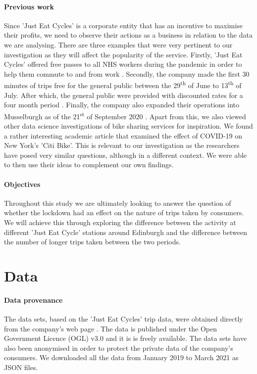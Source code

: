 \documentclass[11pt,a4paper]{article}
\begin{document}
\paragraph{Previous work}Since 'Just Eat Cycles' is a corporate entity that has an incentive to maximise their profits, we need to observe their actions as a business in relation to the data we are analysing. There are three examples that were very pertinent to our investigation as they will affect the popularity of the service. Firstly, 'Just Eat Cycles' offered free passes to all NHS workers during the pandemic in order to help them commute to and from work \cite{Stephen2}. Secondly, the company made the first 30 minutes of trips free for the general public between the 29\textsuperscript{th} of June to 13\textsuperscript{th} of July. After which, the general public were provided with discounted rates for a four month period \cite{Stephen1}. Finally, the company also expanded their operations into Musselburgh as of the 21\textsuperscript{st} of September 2020 \cite{Dalton1}. Apart from this, we also viewed other data science investigations of bike sharing services for inspiration. We found a rather interesting academic article that examined the effect of COVID-19 on New York's 'Citi Bike'\cite{citiBike}. This is relevant to our investigation as the researchers have posed very similar questions, although in a different context. We were able to then use their ideas to complement our own findings.  

\paragraph{Objectives} Throughout this study we are ultimately looking to answer the question of whether the lockdown had an effect on the nature of trips taken by consumers. We will achieve this through exploring the difference between the activity at different 'Just Eat Cycle' stations around Edinburgh and the difference between the number of longer trips taken between the two periods.  

\section{Data}
\paragraph{Data provenance}
The data sets, based on the 'Just Eat Cycles' trip data, were obtained directly from the company's web page \cite{historicalData}. The data is published under the Open Government Licence (OGL) v3.0 and it is is freely available. The data sets have also been anonymised in order to protect the private data of the company's consumers. We downloaded all the data from January 2019 to March 2021 as JSON files. 
\end{document}
